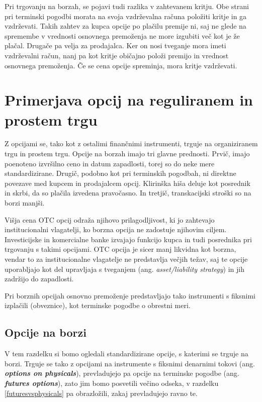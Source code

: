 \documentclass[a4paper]{article}
\begin{document}
Pri trgovanju na borzah, se pojavi tudi razlika v zahtevanem kritju.
Obe strani pri terminski pogodbi morata na svoja vzdrževalna računa položiti kritje in ga vzdrževati. Takih zahtev za kupca opcije
po plačilu premije ni, saj ne glede na spremembe v vrednosti osnovnega premoženja ne more izgubiti več kot je že plačal.
Drugače pa velja za prodajalca. Ker on nosi tveganje mora imeti vzdrževalni račun, nanj pa kot kritje običajno položi premijo in vrednost osnovnega premoženja. Če se cena 
opcije spreminja, mora kritje vzdrževati.

\section{Primerjava opcij na reguliranem in prostem trgu}
Z opcijami se, tako kot z ostalimi finančnimi instrumenti, trguje na organiziranem trgu in prostem trgu. Opcije na borzah imajo tri glavne prednosti. 
Prvič, imajo poenoteno izvršilno ceno in datum zapadlosti, torej so do neke mere standardizirane. Drugič, podobno kot pri terminskih pogodbah, ni direktne povezave
med kupcem in prodajalcem opcij. Klirinška hiša deluje kot posrednik in skrbi, da so plačila izvedena pravočasno. In tretjič, transkacijski
stroški so na borzi manjši. 

Višja cena OTC opcij odraža njihovo prilagodljivost, ki jo zahtevajo institucionalni vlagatelji, ko borzna opcija ne zadostuje
njihovim ciljem. Investicijske in komercialne banke izvajajo funkcijo kupca in tudi posrednika pri trgovanju s takimi
opcijami. OTC opcija je sicer manj likvidna kot borzna, vendar to za institucionalne vlagatelje ne predstavlja večjih težav, 
saj te opcije uporabljajo kot del upravljaja s tveganjem (ang. \textit{asset/liability strategy}) in jih zadržijo do zapadlosti.

Pri borznih opcijah osnovno premoženje predstavljajo tako instrumenti s fiksnimi izplačili (obveznice),
kot terminske pogodbe o obrestni meri.

\subsection{Opcije na borzi}
V tem razdelku si bomo ogledali standardizirane opcije, s katerimi se trguje na borzi. Trguje se 
tako z opcijami na instrumente s fiksnimi denarnimi tokovi  (ang. \textit{\textbf{options on physicals}}), 
prevladujejo pa opcije na terminske pogodbe (ang. \textit{\textbf{futures options}}),
zato jim bomo posvetili večino odseka, v razdelku \ref{futuresvsphysicals} pa obrazložili, zakaj prevladujejo ravno te.
\end{document}
